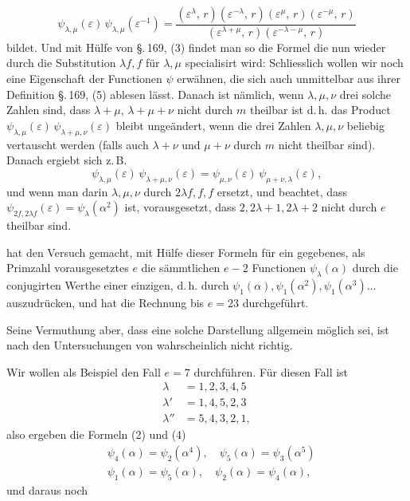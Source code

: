 
\[
\psi_{\lambda,\mu}(\varepsilon)\,\psi_{\lambda,\mu}(\varepsilon^{-1})
= \frac{(\varepsilon^\lambda,\,r)(\varepsilon^{-\lambda},\,r)(\varepsilon^\mu,\,r)(\varepsilon^{-\mu},\,r)}
       {(\varepsilon^{\lambda+\mu},\,r)(\varepsilon^{-\lambda-\mu},\,r)}
\]
bildet. Und mit H\"ulfe von \S.\,169, (3) findet man so die Formel
die nun wieder durch die Substitution $\lambda f, f$ f\"ur $\lambda, \mu$ specialisirt wird:
Schliesslich wollen wir noch eine Eigenschaft der Functionen $\psi$ erw\"ahnen, die sich auch unmittelbar aus ihrer Definition \S.\,169, (5) ablesen l\"asst. Danach ist n\"amlich, wenn $\lambda, \mu, \nu$ drei solche Zahlen sind, dass $\lambda + \mu$, $\lambda + \mu + \nu$ nicht durch $m$ theilbar ist
d.\,h. das Product $\psi_{\lambda,\mu}(\varepsilon)\,\psi_{\lambda+\mu,\nu}(\varepsilon)$ bleibt unge\"andert, wenn die drei Zahlen $\lambda, \mu, \nu$ beliebig vertauscht werden (falls auch $\lambda + \nu$ und $\mu + \nu$ durch $m$ nicht theilbar sind). Danach ergiebt sich z.\,B.
\[
\psi_{\lambda,\mu}(\varepsilon)\,\psi_{\lambda+\mu,\nu}(\varepsilon) = \psi_{\mu,\nu}(\varepsilon)\,\psi_{\mu+\nu,\lambda}(\varepsilon),
\]
und wenn man darin $\lambda, \mu, \nu$ durch $2\lambda f, f, f$ ersetzt, und beachtet, dass $\psi_{2f,2\lambda f}(\varepsilon) = \psi_\lambda(\alpha^2)$ ist,
vorausgesetzt, dass $2, 2\lambda + 1, 2\lambda + 2$ nicht durch $e$ theilbar sind.

 hat den Versuch gemacht, mit H\"ulfe dieser Formeln f\"ur ein gegebenes, als Primzahl vorausgesetztes $e$ die s\"ammtlichen $e - 2$ Functionen $\psi_\lambda(\alpha)$ durch die conjugirten Werthe einer einzigen, d.\,h. durch $\psi_1(\alpha), \psi_1(\alpha^2), \psi_1(\alpha^3) \ldots$ auszudr\"ucken, und hat die Rechnung bis $e = 23$ durchgef\"uhrt.

Seine Vermuthung aber, dass eine solche Darstellung allgemein m\"oglich sei, ist nach den Untersuchungen von  wahrscheinlich nicht richtig.

Wir wollen als Beispiel den Fall $e = 7$ durchf\"uhren. F\"ur diesen Fall ist
\[
\begin{aligned}
\lambda &= 1, 2, 3, 4, 5\\
\lambda' &= 1, 4, 5, 2, 3\\
\lambda'' &= 5, 4, 3, 2, 1,
\end{aligned}
\]
also ergeben die Formeln (2) und (4)
\[
\begin{aligned}
&\psi_4(\alpha) = \psi_2(\alpha^4), \quad \psi_5(\alpha) = \psi_3(\alpha^5)\\
&\psi_1(\alpha) = \psi_5(\alpha), \quad \psi_2(\alpha) = \psi_4(\alpha),
\end{aligned}
\]
und daraus noch
